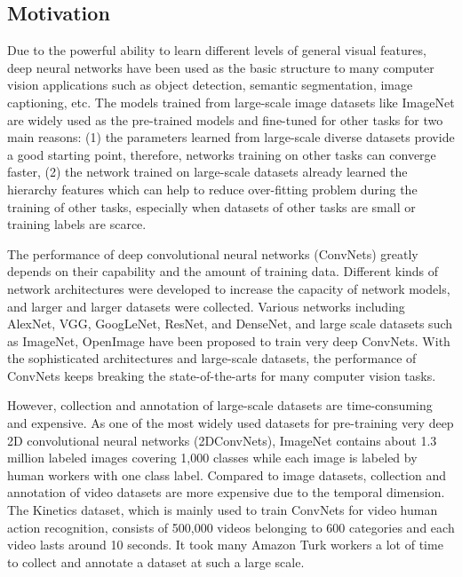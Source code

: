 \documentclass[conference]{IEEEtran}
\begin{document}
\subsection{Motivation}
Due to the powerful ability to learn different levels of general visual features, deep neural networks \cite{b1} have been used as the basic structure to many computer vision applications such as object detection, semantic segmentation, image captioning, etc. 
The models trained from large-scale image datasets like ImageNet are widely used as the pre-trained models and fine-tuned for other tasks for two main reasons: 
(1) the parameters learned from large-scale diverse datasets provide a good starting point, therefore, networks training on other tasks can converge faster, (2) the network trained on large-scale datasets already learned the hierarchy features which can help to reduce over-fitting problem during the training of other tasks, especially when
datasets of other tasks are small or training labels are scarce.

The performance of deep convolutional neural networks (ConvNets) greatly depends on their capability and the amount of training data.
Different kinds of network architectures were developed to increase the capacity of network models, and larger and larger datasets were collected.
Various networks including AlexNet, VGG, GoogLeNet, ResNet, and DenseNet, and large scale datasets such as ImageNet, OpenImage have been proposed to train very deep ConvNets.
With the sophisticated architectures and large-scale datasets, the performance of ConvNets keeps breaking the state-of-the-arts for many computer vision tasks.

However, collection and annotation of large-scale datasets are time-consuming and expensive.
As one of the most widely used datasets for pre-training very deep 2D convolutional neural networks (2DConvNets), ImageNet contains about 1.3 million labeled images covering 1,000 classes while each image is labeled by human workers with one class label.
Compared to image datasets, collection and annotation of video datasets are more expensive due to the temporal dimension.
The Kinetics dataset, which is mainly used to train ConvNets for video human action recognition, consists of  500,000 videos belonging to 600 categories and each video lasts around 10 seconds.
It took many Amazon Turk workers a lot of time to collect and annotate a dataset at such a large scale.
\end{document}
